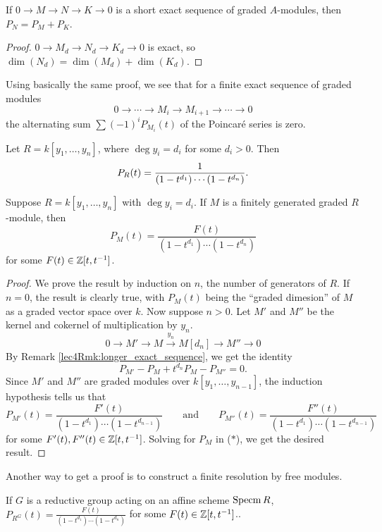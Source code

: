 \begin{lemma}
 If $0\to M\to N\to K\to 0$ is a short exact sequence of graded $A$-modules, then $P_N=P_M+P_K$.
\end{lemma}
\begin{proof}
 $0\to M_d\to N_d\to K_d\to 0$ is exact, so $\dim(N_d)=\dim(M_d)+\dim(K_d)$.
\end{proof}
\begin{remark}\label{lec4Rmk:longer_exact_sequence}
 Using basically the same proof, we see that for a finite exact sequence of graded modules
 \[
  0\to \cdots \to M_i\to M_{i+1}\to \cdots \to 0
 \]
 the alternating sum $\sum (-1)^i P_{M_i}(t)$ of the Poincar\'e series is zero.
\end{remark}
\begin{example}
 Let $R=k[y_1,\dots, y_n]$, where $\deg y_i=d_i$ for some $d_i>0$. Then
 \[
  P_R(t) = \frac{1}{(1-t^{d_1})\cdots (1-t^{d_n})}.\qedhere
 \]
\end{example}
\begin{theorem}\label{lec4Thm:Hilbert-Serre}
 Suppose $R=k[y_1,\dots, y_n]$ with $\deg y_i=d_i$. If $M$ is a finitely generated graded $R$-module, then
 \[
  P_M(t) = \frac{F(t)}{(1-t^{d_1})\cdots (1-t^{d_n})}
 \]
 for some $F(t)\in \mathbb{Z}[t,t^{-1}]$.
\end{theorem}
\begin{proof}
 We prove the result by induction on $n$, the number of generators of $R$. If $n=0$, the result is clearly true, with $P_M(t)$ being the ``graded dimesion'' of $M$ as a graded vector space over $k$. Now suppose $n>0$. Let $M'$ and $M''$ be the kernel and cokernel of multiplication by $y_n$.
 \[
  0\to M'\to M\xrightarrow{y_n} M[d_n]\to M''\to 0
 \]
 By Remark \ref{lec4Rmk:longer_exact_sequence}, we get the identity
 \[
  P_{M'} - P_M + t^{d_n}P_M - P_{M''}=0.
 \tag{$*$}\]
 Since $M'$ and $M''$ are graded modules over $k[y_1,\dots, y_{n-1}]$, the induction hypothesis tells us that
 \[
  P_{M'}(t) = \frac{F'(t)}{(1-t^{d_1})\cdots (1-t^{d_{n-1}})} \qquad\text{and}\qquad P_{M''}(t) = \frac{F''(t)}{(1-t^{d_1})\cdots (1-t^{d_{n-1}})}
 \]
 for some $F'(t),F''(t)\in \mathbb{Z}[t,t^{-1}]$. Solving for $P_M$ in ($*$), we get the desired result.
\end{proof}
Another way to get a proof is to construct a finite resolution by free modules.
\begin{corollary}
 If $G$ is a reductive group acting on an affine scheme $\operatorname{Specm} R$, $P_{R^G}(t)=\displaystyle\frac{F(t)}{(1-t^{d_1})\cdots (1-t^{d_n})}$ for some $F(t)\in \mathbb{Z}[t,t^{-1}]$..
\end{corollary}

